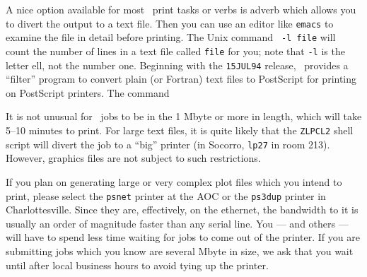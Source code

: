      A nice option available for most \AIPS\ print tasks or verbs
is adverb {\tt {}} which allows you to divert the output
to a text file.  Then you can use an editor like {\tt emacs} to
examine the file in detail before printing.  The Unix command {\tt
{} -l {\tt file}} will count the number of lines in a text file
called {\tt file} for you; note that {\tt -l} is the letter ell, not
the number one. Beginning with the {\tt 15JUL94} release, \AIPS\
provides a ``filter'' program to convert plain (or Fortran) text files
to PostScript for printing on PostScript printers.  The command
\dispx{{\tt \$\qs} \tndx{F2PS} -{\it nn} {\tt <} {\it file} {\tt |}
             lpr -P{\it ppp}}{ }

     It is not unusual for \AIPS\ jobs to be in the 1 Mbyte or more in
length, which will take 5--10 minutes to print.  For large text files,
it is quite likely that the {\tt ZLPCL2} shell script will divert the
job to a ``big''  printer (in Socorro, {\tt lp27} in room 213).
However, graphics files are not subject to such restrictions.

     If you plan on generating large or very complex plot files which
you intend to print, please select the {\tt psnet} printer at the AOC
or the {\tt ps3dup} printer in Charlottesville.  Since they are,
effectively, on the ethernet, the bandwidth to it is usually an order
of magnitude faster than any serial line.  You --- and others
--- will have to spend less time waiting for jobs to come out of the
printer. If you are submitting jobs which you know are several Mbyte
in size, we ask that you wait until after local business hours to
avoid tying up the printer.



